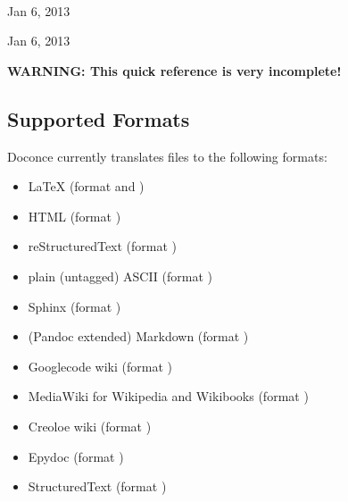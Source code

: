 \documentclass[%
oneside,                 %
final,                   %
chapterprefix=true,      %
open=right               %
10pt]{book}
\begin{document}
\begin{center}


\date{Jan 6, 2013}
\maketitle


\ \\ [10mm]
{\large\textsf{Jan 6, 2013}}

\end{center}
\vfill
\clearpage


\begin{center}
Jan 6, 2013
\end{center}

\vspace{1cm}



\tableofcontents

\vspace{1cm} %






\textbf{WARNING: This quick reference is very incomplete!}

\subsection{Supported Formats}

Doconce currently translates files to the following formats:

\begin{itemize}
 \item {\LaTeX} (format  and )

 \item HTML (format )

 \item reStructuredText (format )

 \item plain (untagged) ASCII (format )

 \item Sphinx (format )

 \item (Pandoc extended) Markdown (format )

 \item Googlecode wiki (format )

 \item MediaWiki for Wikipedia and Wikibooks (format )

 \item Creoloe wiki (format )

 \item Epydoc (format )

 \item StructuredText (format )
\end{itemize}
\end{document}
